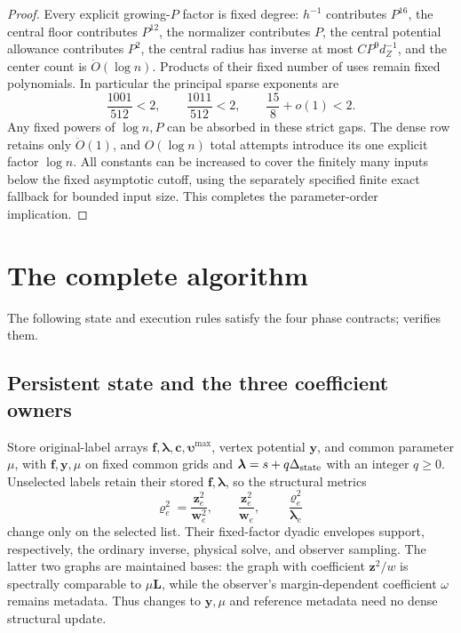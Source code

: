 \documentclass[11pt]{article}
\theoremstyle{remark}
\newcommand{\LL}{\mathbf L}
\newcommand{\cc}{\mathbf c}
\newcommand{\ff}{\mathbf f}
\newcommand{\llambda}{\boldsymbol{\lambda}}
\newcommand{\ww}{\mathbf w}
\newcommand{\yy}{\mathbf y}
\newcommand{\zz}{\mathbf z}
\newcommand{\vvr}{\boldsymbol{\varrho}}
\newcommand{\vvu}{\boldsymbol{\upsilon}}
\renewcommand{\O}{\ddot{O}}
\begin{document}
\begin{proof}
Every explicit growing-$P$ factor is fixed degree: $h^{-1}$ contributes
$P^{16}$, the central floor contributes $P^{12}$, the normalizer contributes
$P$, the central potential allowance contributes $P^2$, the central radius has
inverse at most $CP^9d_Z^{-1}$, and the center count is $\O(\log n)$.
Products of their fixed number of uses remain fixed polynomials.
In particular the principal sparse exponents are
\[
 \frac{1001}{512}<2,\qquad
 \frac{1011}{512}<2,\qquad
 \frac{15}{8}+o(1)<2.
\]
Any fixed powers of $\log n,P$ can be absorbed in these strict gaps.
The dense row retains only $\O(1)$, and $O(\log n)$ total attempts introduce
its one explicit factor $\log n$.
All constants can be increased to cover the finitely many inputs below the fixed
asymptotic cutoff, using the separately specified finite exact fallback for
bounded input size.
This completes the parameter-order implication.
\end{proof}

\section{The complete algorithm}
\label{sec:ram27-joint}

The following state and execution rules satisfy the four phase contracts;
 verifies them.

\subsection{Persistent state and the three coefficient owners}

Store original-label arrays $\ff,\llambda,\cc,\vvu^{\max}$, vertex potential $\yy$, and
common parameter $\mu$, with $\ff,\yy,\mu$ on fixed common grids and
$\llambda=s+q\Delta_{\rm state}$ with an integer $q\ge0$.
Unselected labels retain their stored $\ff,\llambda$, so the structural metrics
\begin{equation}\label{eq:ram27-three-owners}
 \vvr_e^2=\frac{\zz_e^2}{\ww_e^2},\qquad
 \frac{\zz_e^2}{\ww_e},\qquad
 \frac{\vvr_e^2}{\llambda_e}
\end{equation}
change only on the selected list.
Their fixed-factor dyadic envelopes support, respectively, the ordinary inverse,
physical solve, and observer sampling.
The latter two graphs are maintained bases: the graph with coefficient $\zz^2/w$
is spectrally comparable to $\mu\LL$, while the observer's margin-dependent
coefficient $\omega$ remains metadata.
Thus changes to $\yy,\mu$ and reference metadata need no dense structural update.
\end{document}
